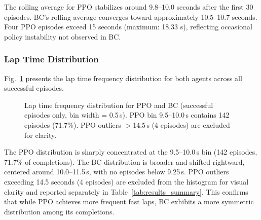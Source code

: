 \documentclass[conference]{IEEEtran}
\begin{document}
The rolling average for PPO stabilizes around 9.8--10.0 seconds after the first 30 episodes. BC's rolling average converges toward approximately 10.5--10.7 seconds. Four PPO episodes exceed 15 seconds (maximum: 18.33 s), reflecting occasional policy instability not observed in BC.

\subsubsection{Lap Time Distribution}

Fig.~\ref{fig:laptime_hist} presents the lap time frequency distribution for both agents across all successful episodes.

\begin{figure}[!t]
\centering
{}
\caption{Lap time frequency distribution for PPO and BC (successful episodes only,
         bin width = 0.5\,s). PPO bin 9.5--10.0\,s contains 142 episodes (71.7\%).
         PPO outliers $>$14.5\,s (4 episodes) are excluded for clarity.}
\label{fig:laptime_hist}
\end{figure}

The PPO distribution is sharply concentrated at the 9.5--10.0\,s bin (142 episodes, 71.7\% of completions). The BC distribution is broader and shifted rightward, centered around 10.0--11.5\,s, with no episodes below 9.25\,s. PPO outliers exceeding 14.5 seconds (4 episodes) are excluded from the histogram for visual clarity and reported separately in Table~\ref{tab:results_summary}. This confirms that while PPO achieves more frequent fast laps, BC exhibits a more symmetric distribution among its completions.
\end{document}
